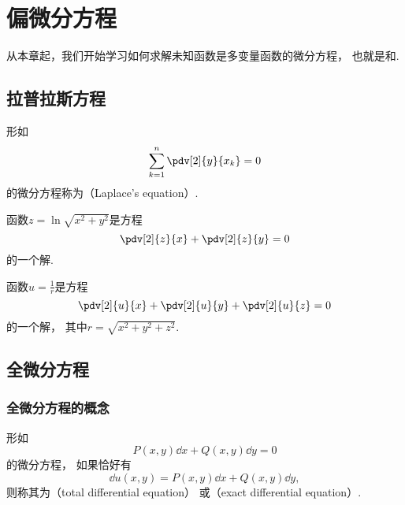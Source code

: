 \chapter{偏微分方程}
从本章起，我们开始学习如何求解未知函数是多变量函数的微分方程，
也就是和.

\section{拉普拉斯方程}
\begin{definition}
形如\begin{equation*}
	\sum_{k=1}^n \pdv[2]{y}{x_k} = 0
\end{equation*}的微分方程称为（Laplace's equation）.
\end{definition}

\begin{example}
函数\(z=\ln\sqrt{x^2+y^2}\)是方程\begin{equation*}
	\pdv[2]{z}{x} + \pdv[2]{z}{y} = 0
\end{equation*}的一个解.
\end{example}

\begin{example}
函数\(u=\frac{1}{r}\)是方程\begin{equation*}
	\pdv[2]{u}{x} + \pdv[2]{u}{y} + \pdv[2]{u}{z} = 0
\end{equation*}的一个解，
其中\(r=\sqrt{x^2+y^2+z^2}\).
\end{example}

\section{全微分方程}
\subsection{全微分方程的概念}
\begin{definition}
形如\begin{equation*}
	P(x,y)\dd{x} + Q(x,y)\dd{y} = 0
\end{equation*}的微分方程，
如果恰好有\begin{equation*}
	\dd{u(x,y)} = P(x,y)\dd{x} + Q(x,y)\dd{y},
\end{equation*}
则称其为（total differential equation）%
或（exact differential equation）.
\end{definition}

